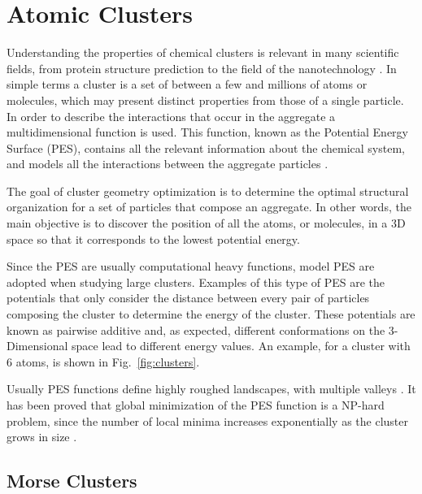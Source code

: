 \chapter{Atomic Clusters}

Understanding the properties of chemical clusters is relevant in many scientific fields, from protein structure prediction to the field of the nanotechnology \cite{wales97}. In simple terms a cluster is a set of between a few and millions of atoms or molecules, which may present distinct properties from those of a single particle. In order to describe the interactions that occur in the aggregate a multidimensional function is used. This function, known as the Potential Energy Surface (PES), contains all the relevant information about the chemical system, and models all the interactions between the aggregate particles \cite{doye06}.

The goal of cluster geometry optimization is to determine the optimal structural organization for a set of particles that compose an aggregate. In other words, the main objective is to discover the position of all the atoms, or molecules, in a 3D space so that it corresponds to the lowest potential energy.

Since the PES are usually computational heavy functions, model PES are adopted when studying large clusters. Examples of this type of PES are the potentials that only consider the distance between every pair of particles composing the cluster to determine the energy of the cluster. These potentials are known  as pairwise additive and, as expected, different conformations on the 3-Dimensional space lead to different energy values. An example, for a cluster with 6 atoms, is shown in Fig.~\ref{fig:clusters}.


\pagebreak

Usually PES functions define highly roughed landscapes, with multiple valleys \cite{stillinger99}. It has been proved that global minimization of the PES function is a NP-hard problem, since the number of local minima increases exponentially as the cluster grows in size \cite{doye98, wille85}.




	\section{Morse Clusters}
	
